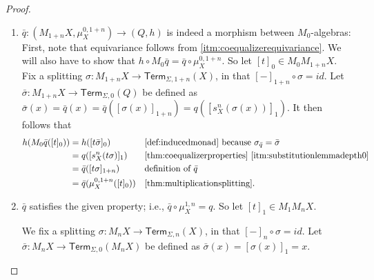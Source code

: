 \documentclass[a4paper,UKenglish,cleveref,thm-restate,numberwithinsect,final]{lipics-v2021}
\newcommand{\Term}{\mathsf{Term}}
\newcommand{\sig}{\Sigma}
\newcommand{\supp}{\mathsf{supp}}
\theoremstyle{plain}
\newcommand{\id}{\mathit{id}}
\numberwithin{equation}{section}
\newcommand{\+}[1]{\mathcal{#1}\xspace}
\theoremstyle{definition}
\begin{document}
\begin{proof}
\begin{enumerate}[wide]
\begin{itemize}
                    If \(d(f) = 1\), we have
                    \begin{align*}
                        \bar{q}([t]_{1 + n}) &= \bar{q}([\nu a.f([t_1]_{n}, \ldots, [t_p]_{n})]_1) \quad \text{and} \\
                        \bar{q}([u]_{1 + n}) &= \bar{q}([\nu b.f([u_1]_{n}, \ldots, [u_p]_{n})]_1)
                    \end{align*}
                    analogously to (cong$_f$).
                    Furthermore, for \(i \in \{1, \ldots, p\}\), we have \([t_i]_n = [(a\ b)u_i]_n = (a\ b)[u_i]_n\) and \(a \notin \supp([u_i]_n) \subseteq \supp(u_i)\) by assumption.
                    The result then follows by (perm).
            \end{itemize}
        \item \label{itm:coequalizermorphism}
            \(\bar{q}: (M_{1 + n} X, \mu^{0, 1 + n}_X) \to (Q, h)\) is indeed a morphism between \(M_0\)-algebras:
            First, note that equivariance follows from \eqref{itm:coequalizerequivariance}.
            We will also have to show that \(h \circ M_0 \bar{q} = \bar{q} \circ \mu^{0, 1 + n}_X\).
            So let \([t]_0 \in M_0 M_{1 + n} X\).
            Fix a splitting \(\sigma: M_{1 + n} X \to \Term_{\sig, 1 + n}(X)\), in that \([-]_{1 + n} \circ \sigma = \id\).
            Let \(\bar{\sigma}: M_{1 + n} X \to \Term_{\sig, 0}(Q)\) be defined as \(\bar{\sigma}(x) = \bar{q}(x) = \bar{q}([\sigma(x)]_{1 + n}) = q([s^n_X(\sigma(x))]_1)\).
            It then follows that
            \begin{align*}
                h(M_0 \bar{q}([t]_0))
                &= h([t\bar{\sigma}]_0) && \text{\cref{def:inducedmonad} because } \sigma_{\bar{q}} = \bar{\sigma} \\
                &= q([s^n_X(t\sigma)]_1) && \text{\cref{thm:coequalizerproperties} \eqref{itm:substitutionlemmadepth0}} \\
                &= \bar{q}([t\sigma]_{1 + n}) && \text{definition of } \bar{q} \\
                &= \bar{q}(\mu^{0, 1 + n}_X([t]_0)) && \text{\cref{thm:multiplicationsplitting}}.
            \end{align*}
        \item \label{itm:coequalizercorrect}
            \(\bar{q}\) satisfies the given property; i.e., \(\bar{q} \circ \mu^{1, n}_X = q\).
            So let \([t]_1 \in M_1 M_n X\).

            We fix a splitting \(\sigma: M_n X \to \Term_{\sig, n}(X)\), in that \([-]_n \circ \sigma = \id\).
            Let \(\bar{\sigma}: M_n X \to \Term_{\sig, 0}(M_n X)\) be defined as \(\bar{\sigma}(x) = [\sigma(x)]_1 = x\).


\end{enumerate}
\end{proof}
\end{document}
